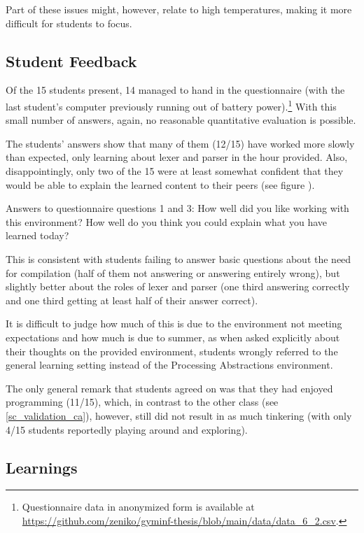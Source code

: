 Part of these issues might, however, relate to high temperatures, making it more difficult for students to focus.


\subsection{Student Feedback}

Of the 15 students present, 14 managed to hand in the questionnaire (with the last student's computer previously running out of battery power).\footnote{Questionnaire data in anonymized form is available at \url{https://github.com/zeniko/gyminf-thesis/blob/main/data/data_6_2.csv}.} With this small number of answers, again, no reasonable quantitative evaluation is possible.

The students' answers show that many of them (12/15) have worked more slowly than expected, only learning about lexer and parser in the hour provided. Also, disappointingly, only two of the 15 were at least somewhat confident that they would be able to explain the learned content to their peers (see figure \cite{fig_plots_28ga}).

\begin{cfigure}{Answers to questionnaire questions 1 and 3: How well did you like working with this environment? How well do you think you could explain what you have learned today?}

\end{cfigure}

This is consistent with students failing to answer basic questions about the need for compilation (half of them not answering or answering entirely wrong), but slightly better about the roles of lexer and parser (one third answering correctly and one third getting at least half of their answer correct).

It is difficult to judge how much of this is due to the environment not meeting expectations and how much is due to summer, as when asked explicitly about their thoughts on the provided environment, students wrongly referred to the general learning setting instead of the Processing Abstractions environment.

The only general remark that students agreed on was that they had enjoyed programming (11/15), which, in contrast to the other class (see \ref{sc_validation_ca}), however, still did not result in as much tinkering (with only 4/15 students reportedly playing around and exploring).


\subsection{Learnings}

